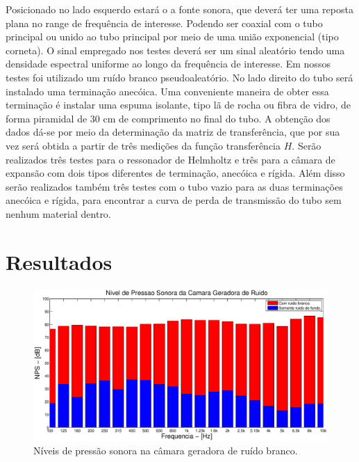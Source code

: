 Posicionado no lado esquerdo estará o a fonte sonora, que deverá ter uma reposta plana no range de frequência de interesse. Podendo ser coaxial com o tubo principal ou unido ao tubo principal por meio de uma união exponencial (tipo corneta). O sinal empregado nos testes deverá ser um sinal aleatório tendo uma densidade espectral uniforme ao longo da frequência de interesse. Em nossos testes foi utilizado um ruído branco pseudoaleatório.
No lado direito do tubo será instalado uma terminação anecóica. Uma conveniente maneira de obter essa terminação é instalar uma espuma isolante, tipo lã de rocha ou fibra de vidro, de forma piramidal de 30 cm de comprimento no final do tubo.
 A obtenção dos dados dá-se por meio da determinação da matriz de transferência, que por sua vez será obtida a partir de três medições da função transferência $H$. Serão realizados três testes para o ressonador de Helmholtz e três para a câmara de expansão com dois tipos diferentes de terminação, anecóica e rígida. Além disso serão realizados também três testes com o tubo vazio para as duas terminações anecóica e rígida, para encontrar a curva de perda de transmissão do tubo sem nenhum material dentro.

\chapter{Resultados}\label{resultados}

\begin{figure}[h]
\hspace{-4.5cm}
\includegraphics[scale=0.6]{codigo/pressao_sonora_geradora.eps}
\caption{Níveis de pressão sonora na câmara geradora de ruído branco.}
\label{resultado_1}
\end{figure}



